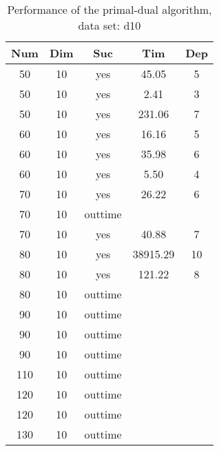 \begin{table}[!htb]
  \centering
  \begin{tabular}[center]{|c|c|c|c|c|}
    \hline
    Num & Dim & Suc & Tim & Dep \\
    \hline
    50 & 10 & yes & 45.05 & 5 \\
    50 & 10 & yes & 2.41 & 3 \\
    50 & 10 & yes & 231.06 & 7 \\
    60 & 10 & yes & 16.16 & 5 \\
    60 & 10 & yes & 35.98 & 6 \\
    60 & 10 & yes & 5.50 & 4 \\
    70 & 10 & yes & 26.22 & 6 \\
    70 & 10 & outtime &&\\
    70 & 10 & yes & 40.88 & 7 \\
    80 & 10 & yes & 38915.29 & 10 \\
    80 & 10 & yes & 121.22 & 8 \\
    80 & 10 & outtime &&\\
    90 & 10 & outtime &&\\
    90 & 10 & outtime &&\\
    90 & 10 & outtime &&\\
    110 & 10 & outtime &&\\
    120 & 10 & outtime & &\\
    120 & 10 & outtime & &\\
    130 & 10 & outtime & &\\
    \hline
  \end{tabular}
  \caption{Performance of the primal-dual algorithm, data set: d10}
  \label{tab:test.pd-d10}
\end{table}

